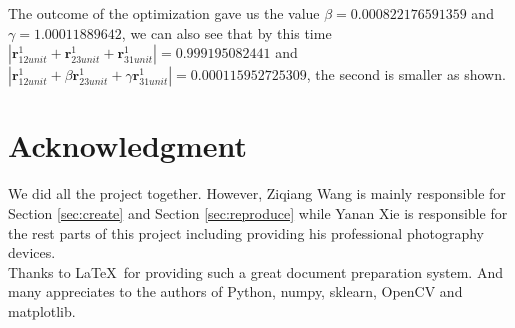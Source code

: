 \documentclass[10pt,twocolumn,letterpaper]{article}
\begin{document}
The outcome of the optimization gave us the value  $\beta = 0.000822176591359$ and $\gamma = 1.00011889642$, we can also see that by this time $| \textbf{r}_{12unit}^{1} +  \textbf{r}_{23unit}^{1} +  \textbf{r}_{31unit}^{1} | = 0.999195082441$ and $| \textbf{r}_{12unit}^{1} + \beta  \textbf{r}_{23unit}^{1} + \gamma  \textbf{r}_{31unit}^{1} | = 0.000115952725309$, the second is smaller as shown.


\section{Acknowledgment}
We did all the project together. However, Ziqiang Wang is mainly responsible for
Section \ref{sec:create} and Section \ref{sec:reproduce} while Yanan Xie is responsible for the rest parts of this project including providing his professional photography devices.\\

Thanks to \LaTeX\ for providing such a great document preparation system. And many appreciates to the authors of Python, numpy, sklearn, OpenCV and matplotlib.\\
\end{document}
